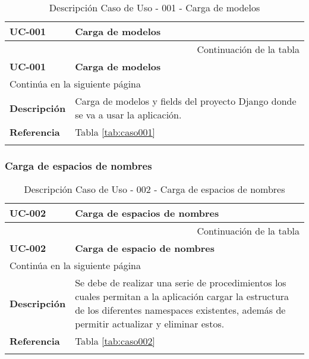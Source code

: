 \begin{center}
\begin{longtable}{||p{3.4cm}|p{12cm}||}
 \hline \hline \bf UC-001 &  \bf Carga de modelos \\
\hline
\endfirsthead
\hline \multicolumn{2}{|r|}{{Continuación de la tabla}} \\ \hline
 \hline \bf UC-001 &  \bf Carga de modelos \\
\hline
\endhead
\hline \multicolumn{2}{|l|}{{Continúa en la siguiente página}} \\ \hline
\endfoot
\endlastfoot
 \hline \bf Descripción & Carga de modelos y fields del proyecto Django
             donde se va a usar la aplicación.\\
 \hline \bf Referencia & Tabla \ref{tab:caso001}\\
\hline
\hline
\caption{\label{tab:caso001-red} Descripción Caso de Uso - 001 - Carga de modelos} 
\end{longtable}
\end{center}


\subsubsection{Carga de espacios de nombres}

\begin{center}
\begin{longtable}{||p{3.4cm}|p{12cm}||}
 \hline \hline \bf UC-002 &  \bf Carga de espacios de nombres \\
\hline
\endfirsthead
\hline \multicolumn{2}{|r|}{{Continuación de la tabla}} \\ \hline
 \hline \bf UC-002 &  \bf Carga de espacio de nombres \\
\hline
\endhead
\hline \multicolumn{2}{|l|}{{Continúa en la siguiente página}} \\ \hline
\endfoot
\endlastfoot
 \hline \bf Descripción & Se debe de realizar una serie de procedimientos los
             cuales permitan a la aplicación cargar la estructura de los
             diferentes namespaces existentes, además de permitir actualizar y
             eliminar estos.\\
 \hline \bf Referencia & Tabla \ref{tab:caso002}\\
\hline
\hline
\caption{\label{tab:caso002-red} Descripción Caso de Uso - 002 - Carga de espacios de nombres}
\end{longtable}
\end{center}


